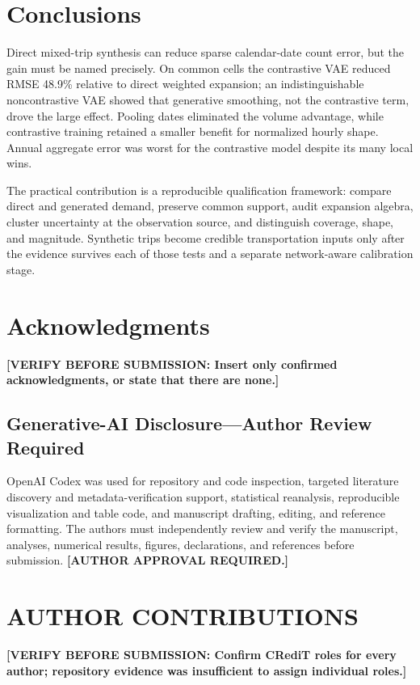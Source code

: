 \documentclass[numbered]{trbunofficial}
\begin{document}
\section{Conclusions}

Direct mixed-trip synthesis can reduce sparse calendar-date count error, but the gain must be named precisely. On common cells the contrastive VAE reduced RMSE 48.9\% relative to direct weighted expansion; an indistinguishable noncontrastive VAE showed that generative smoothing, not the contrastive term, drove the large effect. Pooling dates eliminated the volume advantage, while contrastive training retained a smaller benefit for normalized hourly shape. Annual aggregate error was worst for the contrastive model despite its many local wins.

The practical contribution is a reproducible qualification framework: compare direct and generated demand, preserve common support, audit expansion algebra, cluster uncertainty at the observation source, and distinguish coverage, shape, and magnitude. Synthetic trips become credible transportation inputs only after the evidence survives each of those tests and a separate network-aware calibration stage.

\section{Acknowledgments}
\textbf{[VERIFY BEFORE SUBMISSION: Insert only confirmed acknowledgments, or state that there are none.]}

\subsection{Generative-AI Disclosure---Author Review Required}
OpenAI Codex was used for repository and code inspection, targeted literature discovery and metadata-verification support, statistical reanalysis, reproducible visualization and table code, and manuscript drafting, editing, and reference formatting. The authors must independently review and verify the manuscript, analyses, numerical results, figures, declarations, and references before submission. \textbf{[AUTHOR APPROVAL REQUIRED.]}

\section*{AUTHOR CONTRIBUTIONS}
\textbf{[VERIFY BEFORE SUBMISSION: Confirm CRediT roles for every author; repository evidence was insufficient to assign individual roles.]}
\end{document}
